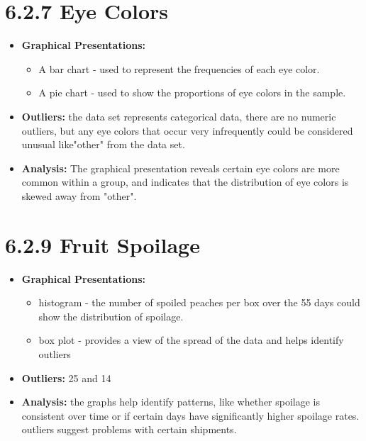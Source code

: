 \documentclass{article}
\begin{document}
\section*{6.2.7 Eye Colors}
\begin{itemize}
    \item \textbf{Graphical Presentations:} 
    \begin{itemize}
        \item A bar chart  - used to represent the frequencies of each eye color.
        \item A pie chart - used to show the proportions of eye colors in the sample.
    \end{itemize}
    \item \textbf{Outliers:} the data set represents categorical data, there are no numeric outliers, but any eye colors that occur very infrequently could be considered unusual like"other" from the data set.
    \item \textbf{Analysis:} The graphical presentation reveals certain eye colors are more common within a group, and indicates that the distribution of eye colors is skewed away from "other".
\end{itemize}

\section*{6.2.9 Fruit Spoilage}
\begin{itemize}
    \item \textbf{Graphical Presentations:} 
    \begin{itemize}
        \item histogram - the number of spoiled peaches per box over the 55 days could show the distribution of spoilage.
        \item  box plot - provides a view of the spread of the data and helps identify outliers 
    \end{itemize}
    \item \textbf{Outliers:} 25 and 14
    \item \textbf{Analysis:} the graphs help identify patterns, like whether spoilage is consistent over time or if certain days have significantly higher spoilage rates. outliers suggest problems with certain shipments.
\end{itemize}
\end{document}

